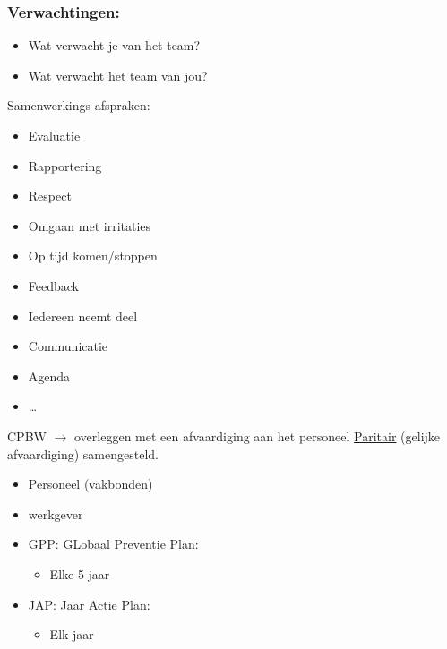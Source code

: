 \documentclass[12pt]{article}
\begin{document}
\subsubsection{Verwachtingen:}
\begin{itemize}
    \item Wat verwacht je van het team?
    \item Wat verwacht het team van jou?
\end{itemize}
Samenwerkings afspraken:\begin{itemize}
    \item Evaluatie
    \item Rapportering 
    \item Respect 
    \item Omgaan met irritaties 
    \item Op tijd komen/stoppen 
    \item Feedback 
    \item Iedereen neemt deel 
    \item Communicatie 
    \item Agenda
    \item \dots
\end{itemize}
CPBW $\rightarrow$ overleggen met een afvaardiging aan het personeel \underline{Paritair} (gelijke afvaardiging) samengesteld.\begin{itemize}
    \item Personeel (vakbonden)
    \item werkgever
\end{itemize}\begin{itemize}
    \item GPP: GLobaal Preventie Plan:\begin{itemize}
        \item Elke 5 jaar 
    \end{itemize}
    \item JAP: Jaar Actie Plan:\begin{itemize}
        \item Elk jaar
    \end{itemize}
\end{itemize}
\end{document}
